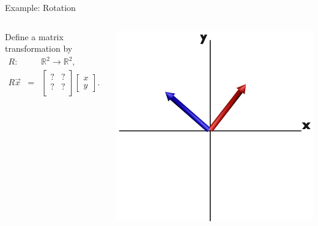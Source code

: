 \documentclass[svgnames,table,,aspectratio=169]{beamer}
\newcommand{\twoByTwo}[4]{%
  \left[
    \begin{array}{rr}
      #1 & #2 \\
      #3 & #4 \\
    \end{array}
  \right]
}
\newcommand{\columnVector}[1]{%
  \left[
    \begin{array}{r}
    #1                           
    \end{array}
  \right]
}
\begin{document}
\begin{frame}{Example: Rotation}
  \begin{columns}[T]
  Define a matrix transformation by
  \begin{eqnarray*}
    R: & & {\mathbb R}^2 \rightarrow {\mathbb R}^2, \\
    R\vec{x} & = & \twoByTwo{?}{?}{?}{?}\columnVector{x\\y}.
  \end{eqnarray*}

  \includegraphics[height=0.7\textheight]{rotatePerp}
\end{columns}
\end{frame}
\end{document}
